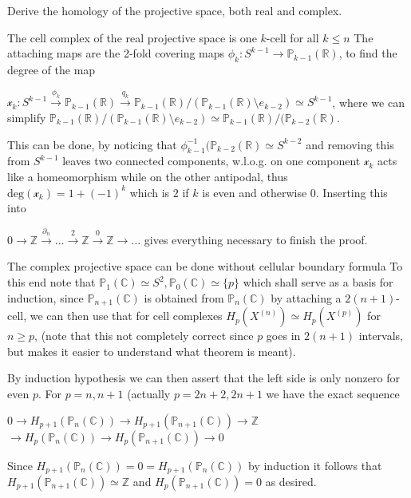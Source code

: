 Derive the homology of the projective space, both real and complex. 

The cell complex of the real projective space  is one \( k \)-cell for all \( k \leq n \)
The attaching maps are the 2-fold covering maps \( \phi_k : S^{k-1} \to \mathbb{P}_{k-1}(\mathbb{R}) \),
to find the degree of the map

\( \mathcal{x}_k : S^{k-1} \xrightarrow{\phi_k} \mathbb{P}_{k-1}(\mathbb{R}) \xrightarrow{q_k} \mathbb{P}_{k-1}(\mathbb{R})/(\mathbb{P}_{k-1}(\mathbb{R}) \setminus e_{k-2}) \simeq S^{k-1}\),
where we can simplify \( \mathbb{P}_{k-1}(\mathbb{R})/(\mathbb{P}_{k-1}(\mathbb{R}) \setminus e_{k-2}) \simeq \mathbb{P}_{k-1}(\mathbb{R})/(\mathbb{P}_{k-2}(\mathbb{R}) \).

This can be done, by noticing that \( \phi_{k-1}^{-1}(\mathbb{P}_{k-2}(\mathbb{R}) \simeq S^{k-2} \) and removing this from \( S^{k-1} \) leaves two connected components,
w.l.o.g. on one component \( \mathcal{x}_k \) acts like a homeomorphism while on the other antipodal, thus  \( \text{deg}(\mathcal{x}_k) = 1 + (-1)^k \) which is \( 2 \) if 
\( k \) is even and otherwise \( 0 \). Inserting this into

\(0 \longrightarrow \mathbb{Z} \xrightarrow{\partial_n} \dots \xrightarrow{2} \mathbb{Z} \xrightarrow{0} \mathbb{Z} \longrightarrow \dots \)
gives everything necessary to finish the proof.

The complex projective space can be done without cellular boundary formula 
To this end note that \( \mathbb{P}_1(\mathbb{C}) \simeq S^2, \mathbb{P}_0(\mathbb{C}) \simeq \{p\} \) which shall serve as a basis for induction,
since \( \mathbb{P}_{n+1}(\mathbb{C}) \) is obtained from \( \mathbb{P}_{n}(\mathbb{C}) \) by attaching a \( 2(n+1) \)-cell, we can then use that
for cell complexes \( H_p(X^{(n)}) \simeq H_p(X^{(p)}) \) for \( n \geq p \), 
(note that this not completely correct since \( p \) goes in \( 2(n+1) \) intervals, but makes it easier to understand what theorem is meant).

By induction hypothesis we can then assert that the left side is only nonzero for even \( p \). For \( p = n, n+1 \) (actually \( p = 2n + 2, 2n + 1 \)
we have the exact sequence

\( 0 \longrightarrow H_{p+1}(\mathbb{P}_n(\mathbb{C})) \longrightarrow H_{p+1}(\mathbb{P}_{n+1}(\mathbb{C})) \longrightarrow \mathbb{Z}\)
\( \longrightarrow H_{p}(\mathbb{P}_n(\mathbb{C})) \longrightarrow H_{p}(\mathbb{P}_{n+1}(\mathbb{C})) \longrightarrow 0\)

Since \(H_{p+1}(\mathbb{P}_n(\mathbb{C})) = 0 =  H_{p+1}(\mathbb{P}_n(\mathbb{C})) \) by induction it follows that
\( H_{p+1}(\mathbb{P}_{n+1}(\mathbb{C})) \simeq \mathbb{Z} \) and \( H_{p}(\mathbb{P}_{n+1}(\mathbb{C})) = 0 \) as desired.



